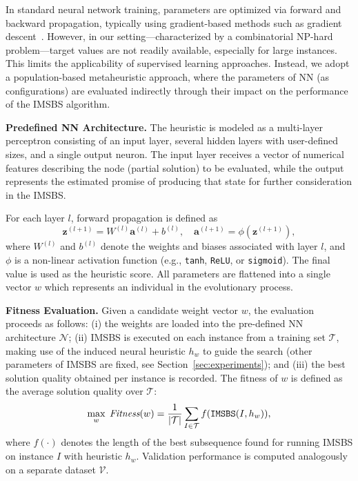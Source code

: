 \documentclass[runningheads]{llncs}
\begin{document}
In standard neural network training, parameters are optimized via forward and backward propagation, typically using gradient-based methods such as  gradient descent~\cite{amari1993backpropagation}. However, in our setting---characterized by a combinatorial \textsc{NP}-hard problem---target values are not readily available, especially for large instances. This limits the applicability of supervised learning approaches. Instead, we adopt a population-based metaheuristic approach, where the parameters of NN (as configurations) are evaluated indirectly through their impact on the performance of the IMSBS algorithm. 

\medskip
\noindent\textbf{Predefined NN Architecture.}
The heuristic is modeled as a multi-layer perceptron consisting of an input layer, several hidden layers with user-defined sizes, and a single output neuron. The input layer receives a vector of numerical features describing the node (partial solution) to be evaluated, while the output represents the estimated promise of producing that state for further consideration in the IMSBS.

For each layer $l$, forward propagation is defined as
\[
\mathbf{z}^{(l+1)} = W^{(l)} \mathbf{a}^{(l)} + b^{(l)}, \quad
\mathbf{a}^{(l+1)} = \phi(\mathbf{z}^{(l+1)}),
\]
where $W^{(l)}$ and $b^{(l)}$ denote the weights and biases associated with layer $l$, and $\phi$ is a non-linear activation function (e.g., \texttt{tanh}, \texttt{ReLU}, or \texttt{sigmoid}). The final value is used as the heuristic score. All parameters are flattened into a single vector $w$ %
  which represents an individual in the evolutionary process.

\medskip
\noindent\textbf{Fitness Evaluation.}
Given a candidate weight vector $w$, the evaluation proceeds as follows: 
(i) the weights are loaded into the pre-defined NN architecture $\mathcal{N}$; 
(ii) IMSBS is executed on each instance from a training set $\mathcal{T}$, making use of the induced neural heuristic $h_w$ to guide the search (other parameters of IMSBS are fixed, see Section~\ref{sec:experiments}); and 
(iii) the best solution quality obtained per instance is recorded. 
The fitness of $w$ is defined as the average solution quality over $\mathcal{T}$:
\begin{equation} \label{eq:training_problem_optimization}
	\max_{w} \; \emph{Fitness}(w)=\frac{1}{|\mathcal T|} \sum_{I \in \mathcal{T}} f(\texttt{IMSBS}(I, h_w)),
\end{equation}
where $f(\cdot)$ denotes the length of the best subsequence found for running IMSBS on instance $I$ with heuristic $
h_w$. Validation performance is computed analogously on a separate dataset $\mathcal{V}$.
\end{document}
